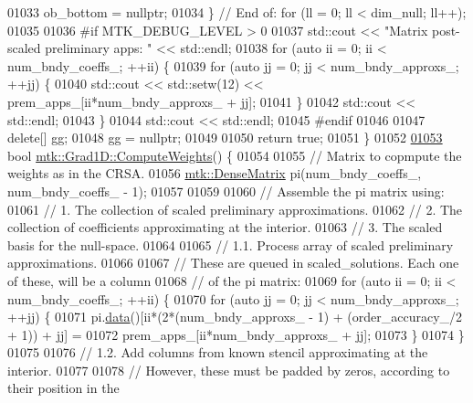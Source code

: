 \begin{DoxyCode}
{{01033     ob\_bottom = \textcolor{keyword}{nullptr};
01034   \} \textcolor{comment}{// End of: for (ll = 0; ll < dim\_null; ll++);}
01035 
01036 \textcolor{preprocessor}{  #if MTK\_DEBUG\_LEVEL > 0}
01037   std::cout << \textcolor{stringliteral}{"Matrix post-scaled preliminary apps: "} << std::endl;
01038   \textcolor{keywordflow}{for} (\textcolor{keyword}{auto} ii = 0; ii < num\_bndy\_coeffs\_; ++ii) \{
01039     \textcolor{keywordflow}{for} (\textcolor{keyword}{auto} jj = 0; jj < num\_bndy\_approxs\_; ++jj) \{
01040       std::cout << std::setw(12) << prem\_apps\_[ii*num\_bndy\_approxs\_ + jj];
01041     \}
01042     std::cout << std::endl;
01043   \}
01044   std::cout << std::endl;
01045 \textcolor{preprocessor}{  #endif}
01046 
01047   \textcolor{keyword}{delete}[] gg;
01048   gg = \textcolor{keyword}{nullptr};
01049 
01050   \textcolor{keywordflow}{return} \textcolor{keyword}{true};
01051 \}
01052 
\hypertarget{mtk__grad__1d_8cc_source_l01053}{}\hyperlink{classmtk_1_1Grad1D_a224082617751864bffca9bfe494c36d5}{01053} \textcolor{keywordtype}{bool} \hyperlink{classmtk_1_1Grad1D_a224082617751864bffca9bfe494c36d5}{mtk::Grad1D::ComputeWeights}() \{
01054 
01055   \textcolor{comment}{// Matrix to copmpute the weights as in the CRSA.}
01056   \hyperlink{classmtk_1_1DenseMatrix}{mtk::DenseMatrix} pi(num\_bndy\_coeffs\_, num\_bndy\_coeffs\_ - 1);
01057 
01059 
01060   \textcolor{comment}{// Assemble the pi matrix using:}
01061   \textcolor{comment}{// 1. The collection of scaled preliminary approximations.}
01062   \textcolor{comment}{// 2. The collection of coefficients approximating at the interior.}
01063   \textcolor{comment}{// 3. The scaled basis for the null-space.}
01064 
01065   \textcolor{comment}{// 1.1. Process array of scaled preliminary approximations.}
01066 
01067   \textcolor{comment}{// These are queued in scaled\_solutions. Each one of these, will be a column}
01068   \textcolor{comment}{// of the pi matrix:}
01069   \textcolor{keywordflow}{for} (\textcolor{keyword}{auto} ii = 0; ii < num\_bndy\_coeffs\_; ++ii) \{
01070     \textcolor{keywordflow}{for} (\textcolor{keyword}{auto} jj = 0; jj < num\_bndy\_approxs\_; ++jj) \{
01071       pi.\hyperlink{classmtk_1_1DenseMatrix_a16b3ff56feb2658b9fc7147d1de4d8e7}{data}()[ii*(2*(num\_bndy\_approxs\_ - 1) + (order\_accuracy\_/2 + 1)) + jj] =
01072         prem\_apps\_[ii*num\_bndy\_approxs\_ + jj];
01073     \}
01074   \}
01075 
01076   \textcolor{comment}{// 1.2. Add columns from known stencil approximating at the interior.}
01077 
01078   \textcolor{comment}{// However, these must be padded by zeros, according to their position in the}
}}
\end{DoxyCode}
